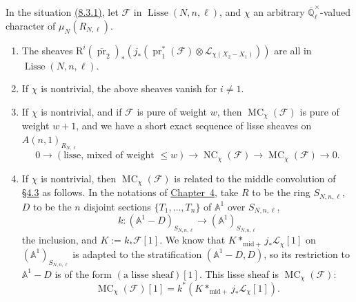 In the situation \hyperref[par:8.3.1]{(8.3.1)}, let \(\mathcal{F}\) in \(\operatorname{Lisse}(N,n,\ell)\), and \(\chi\) an arbitrary \(\overline{\mathbb{Q}}_\ell^{\times}\)-valued character of \(\mu_N(R_{N,\ell})\).
\begin{enumerate}[label=(\arabic*)]
\item The sheaves \(\mathrm{R}^i(\overline{\operatorname{pr}}_2)_*(j_*(\operatorname{pr}_1^*(\mathcal{F})\otimes\mathcal{L}_{\chi(X_2-X_1)}))\) are all in \(\operatorname{Lisse}(N,n,\ell)\).
\item If \(\chi\) is nontrivial, the above sheaves vanish for \(i\ne1\).
\item If \(\chi\) is nontrivial, and if \(\mathcal{F}\) is pure of weight \(w\), then \(\operatorname{MC}_\chi(\mathcal{F})\) is pure of weight \(w+1\), and we have a short exact sequence of lisse sheaves on \(A(n,1)_{R_{N,\ell}}\)
\[
0\to(\text{lisse, mixed of weight }\leq w)\to\operatorname{NC}_\chi(\mathcal{F})\to\operatorname{MC}_\chi(\mathcal{F})\to0.
\]
\item If \(\chi\) is nontrivial, then \(\operatorname{MC}_\chi(\mathcal{F})\) is related to the middle convolution of \hyperref[sec:4.3]{\S4.3} as follows. In the notations of \hyperref[chap:4]{Chapter~4}, take \(R\) to be the ring \(S_{N,n,\ell}\), \(D\) to be the \(n\) disjoint sections \(\{T_1,\ldots,T_n\}\) of \(\mathbb{A}^1\) over \(S_{N,n,\ell}\),
\[
k:(\mathbb{A}^1-D)_{S_{N,n,\ell}}\to(\mathbb{A}^1)_{S_{N,n,\ell}}
\]
the inclusion, and \(K:=k_*\mathcal{F}[1]\). We know that \(K*_{\mathrm{mid}+}j_*\mathcal{L}_\chi[1]\) on \((\mathbb{A}^1)_{S_{N,n,\ell}}\) is adapted to the stratification \((\mathbb{A}^1-D,D)\), so its restriction to \(\mathbb{A}^1-D\) is of the form \((\text{a lisse sheaf})[1]\). This lisse sheaf is \(\operatorname{MC}_\chi(\mathcal{F})\):
\[
\operatorname{MC}_\chi(\mathcal{F})[1]=k^*(K*_{\mathrm{mid}+}j_*\mathcal{L}_\chi[1]).
\]
\end{enumerate}
